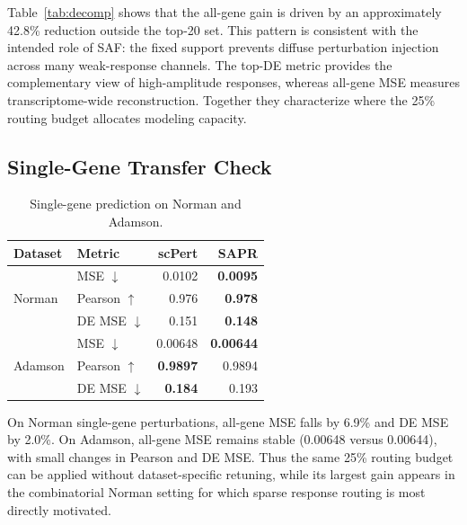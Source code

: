 \documentclass[conference]{IEEEtran}
\newcommand{\method}{SAPR}
\newcommand{\saf}{SAF}
\begin{document}
Table~\ref{tab:decomp} shows that the all-gene gain is driven by an approximately
42.8\% reduction outside the top-20 set. This pattern is consistent with the
intended role of \saf{}: the fixed support prevents diffuse perturbation
injection across many weak-response channels. The top-DE metric provides the
complementary view of high-amplitude responses, whereas all-gene MSE measures
transcriptome-wide reconstruction. Together they characterize where the 25\%
routing budget allocates modeling capacity.

\subsection{Single-Gene Transfer Check}
\begin{table}[t]
\centering
\caption{Single-gene prediction on Norman and Adamson.}
\label{tab:single}
\begin{tabular}{llrr}
\toprule
Dataset & Metric & scPert & \method{} \\
\midrule
\multirow{3}{*}{Norman}
 & MSE $\downarrow$ & 0.0102 & \textbf{0.0095} \\
 & Pearson $\uparrow$ & 0.976 & \textbf{0.978} \\
 & DE MSE $\downarrow$ & 0.151 & \textbf{0.148} \\
\midrule
\multirow{3}{*}{Adamson}
 & MSE $\downarrow$ & 0.00648 & \textbf{0.00644} \\
 & Pearson $\uparrow$ & \textbf{0.9897} & 0.9894 \\
 & DE MSE $\downarrow$ & \textbf{0.184} & 0.193 \\
\bottomrule
\end{tabular}
\end{table}

On Norman single-gene perturbations, all-gene MSE falls by 6.9\% and DE MSE
by 2.0\%. On Adamson, all-gene MSE remains stable (0.00648 versus 0.00644),
with small changes in Pearson and DE MSE. Thus the same 25\% routing budget can
be applied without dataset-specific retuning, while its largest gain appears
in the combinatorial Norman setting for which sparse response routing is most
directly motivated.
\end{document}
